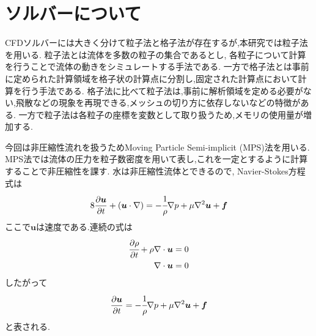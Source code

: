 \section{ソルバーについて}
CFDソルバーには大きく分けて粒子法と格子法が存在するが,本研究では粒子法を用いる.
粒子法とは流体を多数の粒子の集合であるとし,
各粒子について計算を行うことで流体の動きをシミュレートする手法である.
一方で格子法とは事前に定められた計算領域を格子状の計算点に分割し,固定された計算点において計算を行う手法である.
格子法に比べて粒子法は,事前に解析領域を定める必要がない,飛散などの現象を再現できる,メッシュの切り方に依存しないなどの特徴がある.
一方で粒子法は各粒子の座標を変数として取り扱うため,メモリの使用量が増加する.

今回は非圧縮性流れを扱うためMoving Particle Semi-implicit (MPS)法を用いる.\cite{ryuusi}\cite{ELEM13}
MPS法では流体の圧力を粒子数密度を用いて表し,これを一定とするように計算することで非圧縮性を課す.
水は非圧縮性流体とできるので, Navier-Stokes方程式は
\begin{align}
    \label{NSequ}8
    \frac{\partial\bm{u}}{\partial t}+(\bm{u}\cdot\nabla)=-\cfrac{1}{\rho}\nabla p+\mu\nabla^2\bm{u}+\bm{f}
\end{align}
ここで$\bm{u}$は速度である.連続の式は
\begin{align}
    \label{cont1}
    \cfrac{\partial\rho}{\partial t}+\rho\nabla\cdot\bm{u}=0\\
    \label{cont2}
    \nabla\cdot\bm{u}=0
\end{align}
したがって
\begin{align}
    \label{NSequ2}
    \frac{\partial\bm{u}}{\partial t}=-\cfrac{1}{\rho}\nabla p+\mu\nabla^2\bm{u}+\bm{f}
\end{align}
と表される.

